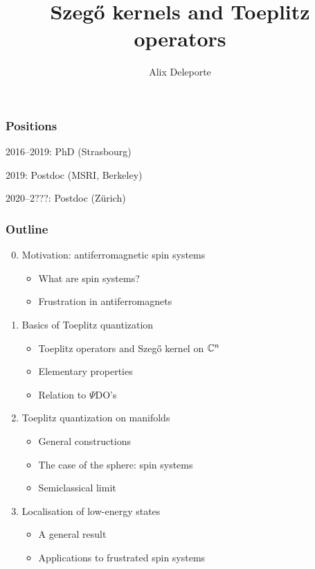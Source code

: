 \documentclass[mathserif]{beamer}
\title{Szeg\H{o} kernels and Toeplitz operators}
\author{Alix Deleporte}
\institute[UZH]{Institut für Mathematik\\Universität Zürich}
\begin{document}
\beamertemplatenavigationsymbolsempty

    \expandafter\def\expandafter\insertshorttitle\expandafter{%
       \insertshorttitle\hfill%
       }%


\begin{frame}
	\titlepage
      \end{frame}

      \begin{frame}
  \frametitle{Positions}
  2016--2019: PhD (Strasbourg)

  \vfill

  2019: Postdoc (MSRI, Berkeley)

  \vfill

  2020--2???: Postdoc (Zürich)
\end{frame}

      \begin{frame}
        \frametitle{Outline}
        \begin{enumerate}\setcounter{enumi}{-1}
        \item Motivation: antiferromagnetic spin systems
          \begin{itemize}
          \item What are spin systems?
          \item Frustration in antiferromagnets
          \end{itemize}
        \item Basics of Toeplitz quantization
          \begin{itemize}
          \item Toeplitz operators and Szeg\H{o} kernel on $\mathbb{C}^n$
          \item Elementary properties
          \item Relation to $\Psi$DO's
          \end{itemize}
        \item Toeplitz quantization on manifolds
          \begin{itemize}
          \item General constructions
          \item The case of the sphere: spin systems
          \item Semiclassical limit
          \end{itemize}
        \item Localisation of low-energy states
          \begin{itemize}
          \item A general result
          \item Applications to frustrated spin systems
          \end{itemize}
        \end{enumerate}
      \end{frame}
\end{document}
